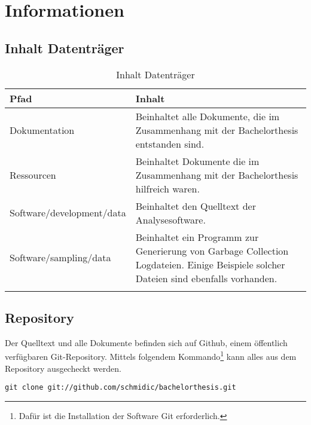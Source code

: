\chapter{Informationen}

\section*{Inhalt Datenträger}
  \begin{longtable}{|p{5cm}|p{8cm}|}
\hline
  \textbf{Pfad} & \textbf{Inhalt}\\\hline
    Dokumentation & Beinhaltet alle Dokumente, die im Zusammenhang mit der Bachelorthesis entstanden sind.\\\hline
    Ressourcen & Beinhaltet Dokumente die im Zusammenhang mit der Bachelorthesis hilfreich waren.\\\hline
    Software/development/data & Beinhaltet den Quelltext der Analysesoftware.\\\hline
    Software/sampling/data & Beinhaltet ein Programm zur Generierung von Garbage Collection Logdateien. Einige Beispiele solcher Dateien sind ebenfalls vorhanden.\\\hline
      \caption{Inhalt Datenträger}\\
  \end{longtable}

\section*{Repository}
Der Quelltext und alle Dokumente befinden sich auf Github, einem öffentlich verfügbaren Git-Repository. Mittels folgendem Kommando\footnote{Dafür ist die Installation der Software Git erforderlich.} kann alles aus dem Repository ausgecheckt werden.

\begin{lstlisting}[caption=Checkout Quelltext Repository]
git clone git://github.com/schmidic/bachelorthesis.git
\end{lstlisting}



